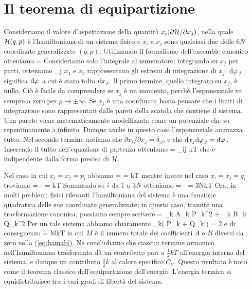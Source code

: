 \section{Il teorema di equipartizione}
\label{sec:equipart}

Consideriamo il valore d'aspettazione della quantità $x_i(\partial{\mathcal H}/\partial x_j)$, nella quale ${\mathcal H}(q,p)$ è l'hamiltoniana di un sistema fisico e $x_i$ e $x_j$ sono qualsiasi due delle $6N$ coordinate generalizzate $(q,p)$. Utilizzando il formalismo dell'ensemble canonico otteniamo
\be
{} = 
\ee
Consideriamo solo l'integrale al numeratore: integrando su $x_j$ per parti, otteniamo
\be
\int{}\de\varphi_j
\ee
$x_1$ e $x_2$ rappresentano gli estremi di integrazione di $x_j$; ${\textrm d}\varphi\,_j$ significa ${\textrm d}\varphi\,$ a cui è stato tolto ${\textrm d}x_j$. Il primo termine, quello integrato su $x_j$, è nullo. Ciò è facile da comprendere se $x_j$ è un momento, perché l'esponenziale va sempre a zero per $p\to\pm\infty$. Se $x_j$ è una coordinata basta pensare che i limiti di integrazione sono rappresentati dalle pareti della scatola che contiene il sistema. Una parete viene matematicamente modellizzata come un potenziale che va repentinamente a infinito. Dunque anche in questo caso l'esponenziale ammazza tutto. Nel secondo termine notiamo che $\partial x_i/\partial x_j = \delta_{ij}$, e che ${\textrm d}x_j{\textrm d}\varphi\,_j = {\textrm d}\varphi\,$. Inserendo il tutto nell'equazione di partenza otteniamo
\be
{} = \delta_{ij} kT
\ee
che è indipendente dalla forma precisa di ${\mathcal H}$.

Nel caso in cui $x_i = x_j = p_i$ abbiamo
\be
{} =  = kT
\ee
mentre invece nel caso $x_i = x_j = q_i$ troviamo
\be
{} = - = kT
\ee
Sommando su $i$ da $1$ a $3N$ otteniamo
\be
{} = - = 3NkT
\ee
Ora, in molti problemi fisici rilevanti l'hamiltoniana del sistema è una funzione quadratica delle sue coordinate generalizzate; in questo caso, tramite una trasformazione canonica, possiamo sempre scrivere
\be
\label{eq:hamab}
\Ham = \sum_k A_k P_k^2 + \sum_k B_k Q_k^2
\ee
Per un tale sistema abbiamo chiaramente
\be
\sum_k\left( P_k + Q_k \right) = 2\Ham
\ee
e di conseguenza
\be
\aspetta{\Ham} =  MkT
\ee
in cui $M$ è il numero totale dei coefficienti $A$ e $B$ diversi da zero nella (\ref{eq:hamab}). Ne concludiamo che ciascun termine armonico nell'hamiltoniana trasformata dà un contributo pari a $\frac{1}{2}kT$ all'energia interna del sistema, e dunque un contributo $\frac{1}{2}k$ al calore specifico $C_V$. Questo risultato è noto come il teorema classico dell'equipartizione dell'energia. L'energia termica si equidistribuisce tra i vari gradi di libertà del sistema.

